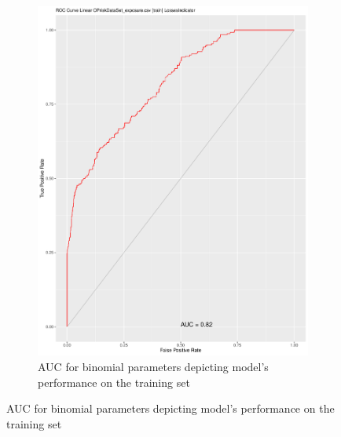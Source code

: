 \documentclass[
]{article}
\begin{document}
\begin{figure}[t!]
\begin{subfigure}{0.48\textwidth}
\includegraphics[width=\linewidth]{BIN_ROC_Training.pdf}
\caption{AUC for binomial parameters depicting model's performance on the training set} \label{BIN_ROC_Train}
\end{subfigure}


\end{figure}
\end{document}
